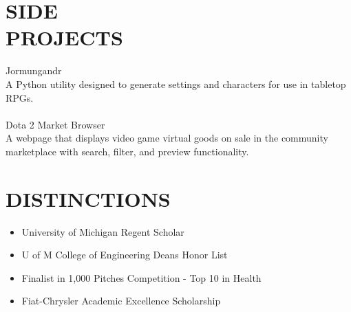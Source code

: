 \documentclass[line,margin]{res}
\begin{document}
\begin{resume}
\section{\textcolor{HeaderColor}{SIDE \\ PROJECTS}}
	{\sc Jormungandr} \\
	A Python utility designed to generate settings and characters for use in tabletop RPGs.\\
\\
	{\sc Dota 2 Market Browser} \\
	A webpage that displays video game virtual goods on sale in the community marketplace with search, filter, and preview functionality.\\
	

\section{\textcolor{HeaderColor}{DISTINCTIONS}}
    \begin{itemize} \itemsep-0.2em
    \item University of Michigan Regent Scholar
    \item U of M College of Engineering Dean\textquotesingle s Honor List
    \item Finalist in 1,000 Pitches Competition - Top 10 in Health
    \item Fiat-Chrysler Academic Excellence Scholarship
    \end{itemize}
 

\end{resume}
\end{document}
